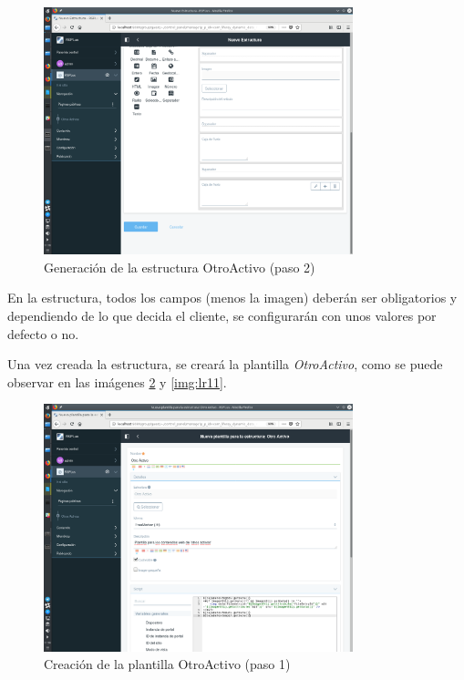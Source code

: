 \begin{figure}[H]
\begin{center}
\includegraphics[width=0.8\textwidth]{./img/liferay/9.png}
\end{center}
\caption{Generación de la estructura OtroActivo (paso 2)}
\label{img:lr9}
\end{figure}

\par En la estructura, todos los campos (menos la imagen) deberán ser obligatorios y dependiendo de lo que decida el cliente, se configurarán con unos valores por defecto o no.

\par Una vez creada la estructura, se creará la plantilla \textit{OtroActivo}, como se puede observar en las imágenes \ref{img:lr10} y \ref{img:lr11}.

\begin{figure}[H]
\begin{center}
\includegraphics[width=0.8\textwidth]{./img/liferay/10.png}
\end{center}
\caption{Creación de la plantilla OtroActivo (paso 1)}
\label{img:lr10}
\end{figure}

